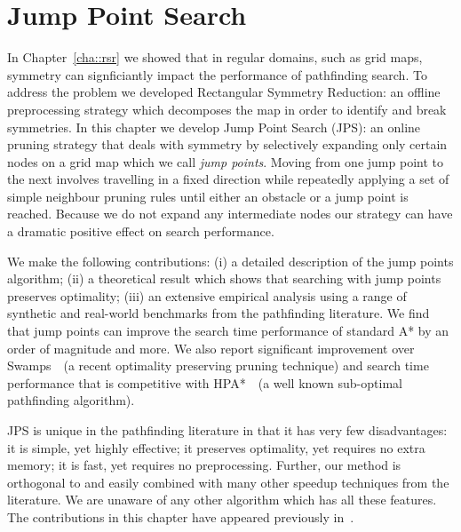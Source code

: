 \chapter{Jump Point Search}
\label{cha::jps}
In Chapter~\ref{cha::rsr} we showed that in regular domains, such as grid maps,
symmetry can signficiantly impact the performance of pathfinding search.
 To address the problem we developed Rectangular Symmetry Reduction:
 an offline preprocessing strategy which decomposes the map in order to 
identify and break symmetries.
 In this chapter we develop Jump Point Search 
(JPS): an online pruning strategy that
deals with symmetry by selectively expanding only certain nodes on a grid map
which we call \emph{jump points}.  
Moving from one jump point to the next
involves travelling in a fixed direction while repeatedly applying a set of
simple neighbour pruning rules until either an obstacle or a jump point is
reached.  Because we do not expand any intermediate nodes %
our strategy can have a dramatic positive effect on search performance.
\par
We make the following contributions: (i) a detailed description of the jump
points algorithm; (ii) a theoretical result which shows that searching with jump
points preserves optimality;  (iii) an extensive empirical analysis using
a range of synthetic and real-world benchmarks from the pathfinding literature.
We find that jump points can improve the search time performance of standard A* by
an order of magnitude and more.  We also report significant improvement over
Swamps~\citep{pochter10}~(a recent optimality preserving pruning technique) and
search time performance that is competitive with HPA*~\citep{botea04}~(a well known 
sub-optimal pathfinding algorithm).
\par
JPS is unique in the pathfinding literature in that it has very few
disadvantages: it is simple, yet highly effective; it preserves optimality, yet
requires no extra memory;  it is fast, yet requires no preprocessing.
Further, our method is orthogonal to and easily combined with 
many other speedup techniques from the literature.
We are unaware of any other algorithm which has all these features.
\\ \newline 
The contributions in this chapter have appeared previously in~\citep{harabor11b,harabor12}.
\newpage
